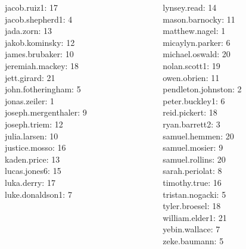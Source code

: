 \documentclass[10pt]{beamer}
\begin{document}
\begin{frame}
\begin{columns}
\begin{column}{0.33\textwidth}
jacob.ruiz1: 17 \\ 
jacob.shepherd1: 4 \\ 
jada.zorn: 13 \\ 
jakob.kominsky: 12 \\ 
james.brubaker: 10 \\ 
jeremiah.mackey: 18 \\ 
jett.girard: 21 \\ 
john.fotheringham: 5 \\ 
jonas.zeiler: 1 \\ 
joseph.mergenthaler: 9 \\ 
joseph.triem: 12 \\ 
julia.larsen: 10 \\ 
justice.mosso: 16 \\ 
kaden.price: 13 \\ 
lucas.jones6: 15 \\ 
luka.derry: 17 \\ 
luke.donaldson1: 7 \\\end{column}
\begin{column}{0.33\textwidth}
lynsey.read: 14 \\ 
mason.barnocky: 11 \\ 
matthew.nagel: 1 \\ 
micaylyn.parker: 6 \\ 
michael.oswald: 20 \\ 
nolan.scott1: 19 \\ 
owen.obrien: 11 \\ 
pendleton.johnston: 2 \\ 
peter.buckley1: 6 \\ 
reid.pickert: 18 \\ 
ryan.barrett2: 3 \\ 
samuel.hemmen: 20 \\ 
samuel.mosier: 9 \\ 
samuel.rollins: 20 \\ 
sarah.periolat: 8 \\ 
timothy.true: 16 \\ 
tristan.nogacki: 5 \\ 
tyler.broesel: 18 \\ 
william.elder1: 21 \\ 
yebin.wallace: 7 \\ 
zeke.baumann: 5 \\\end{column}
\end{columns}
\vfill
\end{frame}
\end{document}
